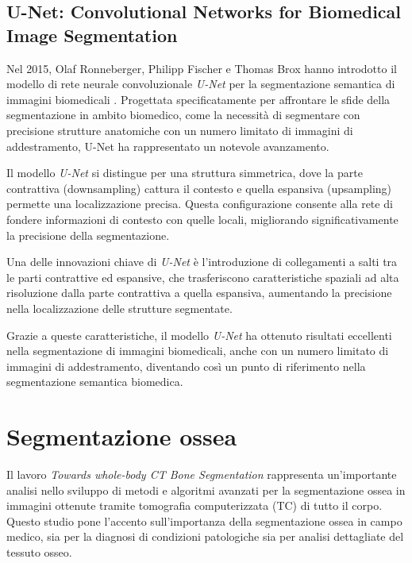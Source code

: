 \subsection{U-Net: Convolutional Networks for Biomedical Image Segmentation}

Nel 2015, Olaf Ronneberger, Philipp Fischer e Thomas Brox hanno introdotto il modello di rete
neurale convoluzionale \textit{U-Net} per la segmentazione semantica di immagini biomedicali
\cite{ronneberger2015unet}. Progettata specificatamente per affrontare le sfide della segmentazione
in ambito biomedico, come la necessità di segmentare con precisione strutture anatomiche con un
numero limitato di immagini di addestramento, U-Net ha rappresentato un notevole avanzamento.

Il modello \textit{U-Net} si distingue per una struttura simmetrica, dove la parte contrattiva
(downsampling) cattura il contesto e quella espansiva (upsampling) permette una localizzazione
precisa. Questa configurazione consente alla rete di fondere informazioni di contesto con quelle
locali, migliorando significativamente la precisione della segmentazione.

Una delle innovazioni chiave di \textit{U-Net} è l'introduzione di collegamenti a salti tra le parti
contrattive ed espansive, che trasferiscono caratteristiche spaziali ad alta risoluzione dalla parte
contrattiva a quella espansiva, aumentando la precisione nella localizzazione delle strutture
segmentate.

Grazie a queste caratteristiche, il modello \textit{U-Net} ha ottenuto risultati eccellenti nella
segmentazione di immagini biomedicali, anche con un numero limitato di immagini di addestramento,
diventando così un punto di riferimento nella segmentazione semantica biomedica.




\section{Segmentazione ossea} \label{sec:segmentazione_ossea}

Il lavoro \textit{Towards whole-body CT Bone Segmentation} \cite{10.1007/978-3-662-56537-7_59}
rappresenta un'importante analisi nello sviluppo di metodi e algoritmi avanzati per la segmentazione
ossea in immagini ottenute tramite tomografia computerizzata (TC) di tutto il corpo. Questo studio
pone l'accento sull'importanza della segmentazione ossea in campo medico, sia per la diagnosi di
condizioni patologiche sia per analisi dettagliate del tessuto osseo.


